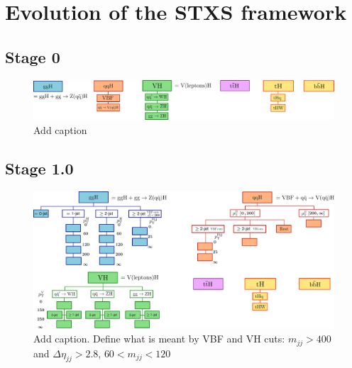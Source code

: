 \chapter{Evolution of the STXS framework}\label{app:merging_schemes}

\section{Stage 0}
\begin{figure}[htb!]
  \centering
  \includegraphics[width=1\linewidth]{Figures/app_merging_schemes/stage0.pdf}
  \caption[Schematic of the STXS stage 0 binning scheme]
  {
    Add caption
  }
  \label{fig:stxs_schematic_stage0}
\end{figure}

\FloatBarrier
\section{Stage 1.0}
\begin{figure}[htb!]
  \centering
  \includegraphics[width=1\linewidth]{Figures/app_merging_schemes/stage1p0.pdf}
  \caption[Schematic of the STXS stage 1.0 binning scheme]
  {
    Add caption. Define what is meant by VBF and VH cuts: $m_{jj}>400$ and $\Delta\eta_{jj}>2.8$, $60<m_{jj}<120$
  }
  \label{fig:stxs_schematic_stage1p0}
\end{figure}

\FloatBarrier
